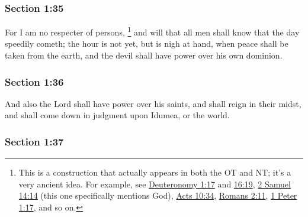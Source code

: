 	\subsubsection{Section 1:35} %
		\label{DC1-35}

		For I am no respecter of persons,%
		\footnote{%
			This is a construction that actually appears in both the OT and NT; it's a very ancient idea. For example, see \hyperref[DEUTERONOMY-1-17]{Deuteronomy 1:17} and \hyperref[DEUTERONOMY-16-19]{16:19}, \hyperref[2SAMUEL-14-14-]{2 Samuel 14:14} (this one specifically mentions God), \hyperref[ACTS-10-34]{Acts 10:34}, \hyperref[ROMANS-2-11]{Romans 2:11}, \hyperref[1PETER-1-17]{1 Peter 1:17}, and so on.
			} 
		and will that all men shall know that the day speedily cometh; the hour is not yet, but is nigh at hand, when peace shall be taken from the earth, and the devil shall have power over his own dominion.


	\subsubsection{Section 1:36} %
		\label{DC1-36}

		And also the Lord shall have power over his saints, and shall reign in their midst, and shall come down in judgment upon Idumea, or the world.


	\subsubsection{Section 1:37} %
		\label{DC1-37}

